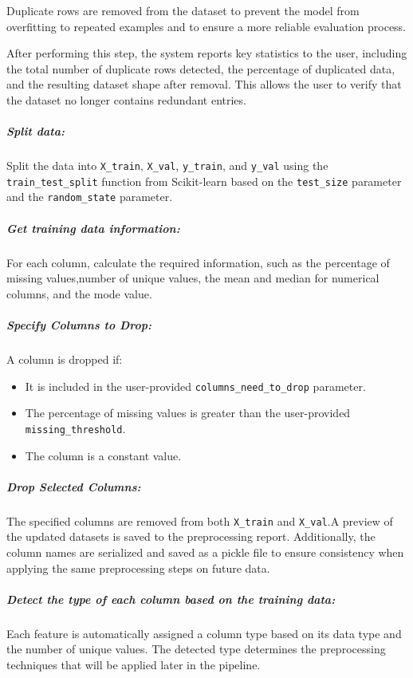 Duplicate rows are removed from the dataset to prevent the model from overfitting to repeated examples and to ensure a more reliable evaluation process.

After performing this step, the system reports key statistics to the user, including the total number of duplicate rows detected, the percentage of duplicated data, and the resulting dataset shape after removal. This allows the user to verify that the dataset no longer contains redundant entries.

\subparagraph{ Split data:}
Split the data into \texttt{X\_train}, \texttt{X\_val}, \texttt{y\_train}, and \texttt{y\_val} using the \texttt{train\_test\_split} function from Scikit-learn based on the \texttt{test\_size} parameter and the \texttt{random\_state} parameter.\vspace{5cm}
\subparagraph{ Get training data information:}
For each column, calculate the required information, such as the percentage of missing values,number of unique values, the mean and median for numerical columns, and the mode value.
\subparagraph{Specify Columns to Drop:}
A column is dropped if:
\begin{itemize}
    \item It is included in the user-provided \texttt{columns\_need\_to\_drop} parameter.
    \item The percentage of missing values is greater than the user-provided \texttt{missing\_threshold}.
    \item The column is a constant value.
\end{itemize}
\subparagraph{Drop Selected Columns:}
The specified columns are removed from both \texttt{X\_train} and \texttt{X\_val}.A preview of the updated datasets is saved to the preprocessing report. Additionally, the column names are serialized and saved as a pickle file to ensure consistency when applying the same preprocessing steps on future data.
\subparagraph{Detect the type of each column based on the training data:}
Each feature is automatically assigned a column type based on its data type and the number of unique values. The detected type determines the preprocessing techniques that will be applied later in the pipeline.
